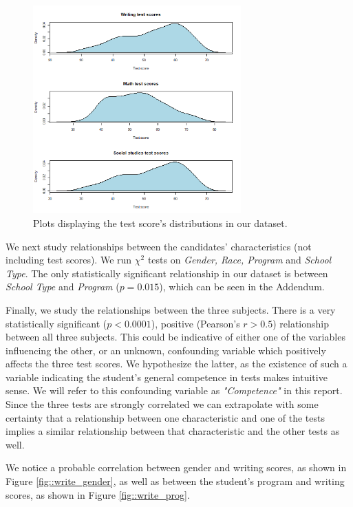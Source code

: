 \documentclass[10pt, a4paper]{article}
\begin{document}
	\begin{figure}
		\includegraphics[width=8cm]{density_plots.png}
		\centering
		\caption{Plots displaying the test score's distributions in our dataset.}
		\label{fig::test_distribution}
	\end{figure}
		
	We next study relationships between the candidates' characteristics (not including test scores). We run $\chi^2$ tests on \textit{Gender, Race, Program} and \textit{School Type}. The only statistically significant relationship in our dataset is between \textit{School Type} and \textit{Program} ($p = 0.015$), which can be seen in the Addendum.
	
	Finally, we study the relationships between the three subjects. There is a very statistically significant ($p < 0.0001$), positive (Pearson's $r > 0.5$) relationship between all three subjects. This could be indicative of either one of the variables influencing the other, or an unknown, confounding variable which positively affects the three test scores. We hypothesize the latter, as the existence of such a variable indicating the student's general competence in tests makes intuitive sense. We will refer to this confounding variable as \textit{"Competence"} in this report. Since the three tests are strongly correlated we can extrapolate with some certainty that a relationship between one characteristic and one of the tests implies a similar relationship between that characteristic and the other tests as well.
	
	We notice a probable correlation between gender and writing scores, as shown in Figure \ref{fig::write_gender}, as well as between the student's program and writing scores, as shown in Figure \ref{fig::write_prog}.
	
\end{document}
